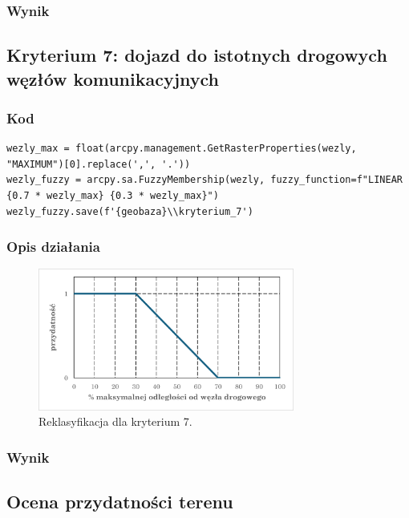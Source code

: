 \documentclass{article}
\begin{document}
\subsubsection{Wynik}
\newpage
\subsection{Kryterium 7: dojazd do istotnych drogowych węzłów komunikacyjnych}
\subsubsection{Kod}
\begin{lstlisting}
wezly_max = float(arcpy.management.GetRasterProperties(wezly, "MAXIMUM")[0].replace(',', '.'))
wezly_fuzzy = arcpy.sa.FuzzyMembership(wezly, fuzzy_function=f"LINEAR {0.7 * wezly_max} {0.3 * wezly_max}")
wezly_fuzzy.save(f'{geobaza}\\kryterium_7')
\end{lstlisting}

\subsubsection{Opis działania}
\begin{figure}[H]
    \centering
    \includegraphics[width=0.75\textwidth]{img/kryterium7-wykres-glowny.png}
    \caption*{Reklasyfikacja dla kryterium 7.}
\end{figure}

\subsubsection{Wynik}


\subsection{Ocena przydatności terenu}
\end{document}
